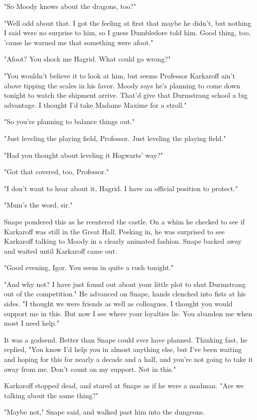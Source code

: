 \documentclass[a4paper,11pt]{article}
\begin{document}
"So Moody knows about the dragons, too?"

"Well odd about that. I got the feeling at first that maybe he didn't, but nothing I said were no surprise to him, so I guess Dumbledore told him. Good thing, too, 'cause he warned me that something were afoot."

"Afoot? You shock me Hagrid. What could go wrong?"

"You wouldn't believe it to look at him, but seems Professor Karkaroff ain't above tipping the scales in his favor. Moody says he's planning to come down tonight to watch the shipment arrive. That'd give that Durmstrang school a big advantage. I thought I'd take Madame Maxime for a stroll."

"So you're planning to balance things out."

"Just leveling the playing field, Professor. Just leveling the playing field."

"Had you thought about leveling it Hogwarts' way?"

"Got that covered, too, Professor."

"I don't want to hear about it, Hagrid. I have an official position to protect."

"Mum's the word, sir."

Snape pondered this as he reentered the castle. On a whim he checked to see if Karkaroff was still in the Great Hall. Peeking in, he was surprised to see Karkaroff talking to Moody in a clearly animated fashion. Snape backed away and waited until Karkaroff came out.

"Good evening, Igor. You seem in quite a rush tonight."

"And why not? I have just found out about your little plot to shut Durmstrang out of the competition." He advanced on Snape, hands clenched into fists at his sides. "I thought we were friends as well as colleagues. I thought you would support me in this. But now I see where your loyalties lie. You abandon me when most I need help."

It was a godsend. Better than Snape could ever have planned. Thinking fast, he replied, "You know I'd help you in almost anything else, but I've been waiting and hoping for this for nearly a decade and a half, and you're not going to take it away from me. Don't count on my support. Not in this."

Karkaroff stopped dead, and stared at Snape as if he were a madman. "Are we talking about the same thing?"

"Maybe not," Snape said, and walked past him into the dungeons.
\end{document}
